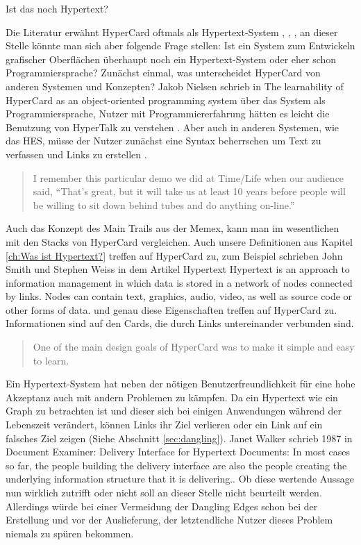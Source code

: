 \begin{section}{Ist das noch Hypertext?}
\label{sec:nochHypertext}

Die Literatur erwähnt HyperCard oftmals als Hypertext-System \cite{Nielsen1995}, \cite{Dam1988}, \cite{Smith1988}, an dieser Stelle könnte man sich aber folgende Frage stellen: Ist ein System zum Entwickeln grafischer Oberflächen überhaupt noch ein Hypertext-System oder eher schon Programmiersprache? 
Zunächst einmal, was unterscheidet HyperCard von anderen Systemen und Konzepten? Jakob Nielsen schrieb in The learnability of HyperCard as an object-oriented programming system über das System als Programmiersprache, Nutzer mit Programmiererfahrung hätten es leicht die Benutzung von HyperTalk zu verstehen \cite{Nielsen1991}. Aber auch in anderen Systemen, wie das HES, müsse der Nutzer zunächst eine Syntax beherrschen um Text zu verfassen und Links zu erstellen \cite{Dam1969}.

\begin{quote}
\glqq I remember this particular demo we did at Time/Life when our audience said, “That’s great, but it will take us at least 10 years before people will be willing to sit down behind tubes and do anything on-line.”\grqq{ }\cite{Dam1988}
\end{quote}

Auch das Konzept des Main Trails aus der Memex, kann man im wesentlichen mit den Stacks von HyperCard vergleichen. Auch unsere Definitionen aus Kapitel \ref{ch:Was ist Hypertext?} treffen auf HyperCard zu, zum Beispiel schrieben John Smith und Stephen Weiss in dem Artikel Hypertext \glqq [...] Hypertext is an approach to information management in which data is stored in a network of nodes connected by links. Nodes can contain text, graphics, audio, video, as well as source code or other forms of data.\grqq{ }\cite{Smith1988} und genau diese Eigenschaften treffen auf HyperCard zu. Informationen sind auf den Cards, die durch Links untereinander verbunden sind.

\begin{quote}
\glqq One of the main design goals of HyperCard was to make it simple and easy to learn.\grqq \cite{Nielsen1991}
\end{quote}

Ein Hypertext-System hat neben der nötigen Benutzerfreundlichkeit für eine hohe Akzeptanz auch mit andern Problemen zu kämpfen. Da ein Hypertext wie ein Graph zu betrachten ist und dieser sich bei einigen Anwendungen während der Lebenszeit verändert, können Links ihr Ziel verlieren oder ein Link auf ein falsches Ziel zeigen (Siehe Abschnitt \ref{sec:dangling}). Janet Walker schrieb 1987 in Document Examiner: Delivery Interface for Hypertext Documents: \glqq In most cases so far, the people building the delivery interface are also the people creating the underlying information structure that it is delivering.. Ob diese wertende Aussage nun wirklich zutrifft oder nicht soll an dieser Stelle nicht beurteilt werden. Allerdings würde bei einer Vermeidung der Dangling Edges schon bei der Erstellung und vor der Auslieferung, der letztendliche Nutzer dieses Problem niemals zu spüren bekommen.


\end{section}
